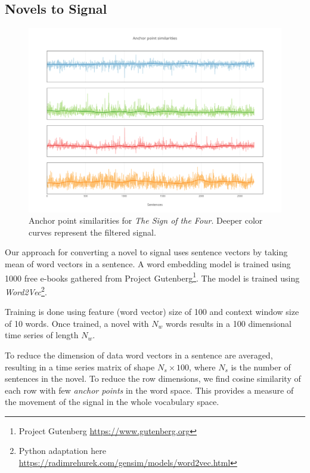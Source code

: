 \documentclass[%
 aip,
rsi,%
 amsmath,amssymb,
 reprint,%
author-year,
groupedaddress
]{revtex4-1}
\begin{document}
\subsection{Novels to Signal}

\begin{figure}[!htb]
    \centering
    \includegraphics[width=\textwidth]{word2vec_anchors}
    \caption{Anchor point similarities for {\sl The Sign of the Four}. Deeper color curves represent the filtered signal.}
    \label{fig:anchor}
\end{figure}

Our approach for converting a novel to signal uses sentence vectors by taking mean of word vectors in a sentence. A word embedding model is trained using 1000 free e-books gathered from Project Gutenberg\footnote{Project Gutenberg \url{https://www.gutenberg.org}}. The model is trained using {\sl Word2Vec}\footnote{Python adaptation here \url{https://radimrehurek.com/gensim/models/word2vec.html}}.

Training is done using feature (word vector) size of 100 and context window size of 10 words. Once trained, a novel with $N_{w}$ words results in a 100 dimensional time series of length $N_{w}$.

To reduce the dimension of data word vectors in a sentence are averaged, resulting in a time series matrix of shape $N_{s} \times 100$, where $N_{s}$ is the number of sentences in the novel. To reduce the row dimensions, we find cosine similarity of each row with few {\sl anchor points} in the word space. This provides a measure of the movement of the signal in the whole vocabulary space.
\end{document}
